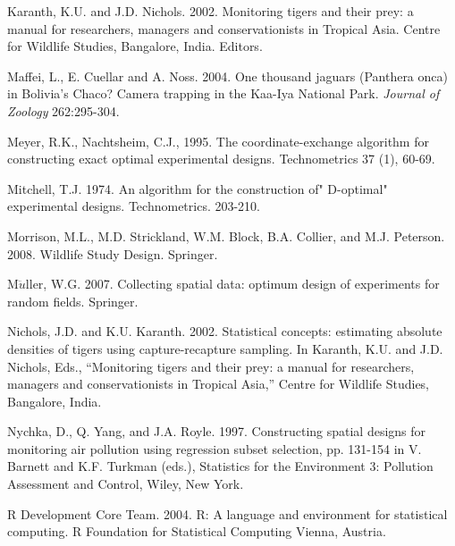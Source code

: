 \documentclass[useAMS,referee]{biom}
\begin{document}
 
\rf Karanth, K.U. and J.D. Nichols. 2002. Monitoring tigers and their 
prey: a manual for researchers, managers and conservationists in 
Tropical Asia. Centre for Wildlife Studies, Bangalore, India. Editors.

\rf Maffei, L., E. Cuellar and A. Noss. 2004. 
One thousand jaguars (Panthera onca) 
in Bolivia's Chaco? Camera trapping in the Kaa-Iya National Park. 
{\it Journal of Zoology} 262:295-304.


\rf Meyer, R.K., Nachtsheim, C.J., 1995. The coordinate-exchange algorithm for 
constructing exact optimal
experimental designs. Technometrics 37 (1), 60-69.

\rf Mitchell, T.J. 1974.
An algorithm for the construction of" D-optimal" experimental designs.
Technometrics.
203-210.

\rf Morrison, M.L., M.D. Strickland, W.M. Block, B.A. Collier, and 
M.J. Peterson. 2008. Wildlife Study Design. Springer.

\rf M$\ddot{u}$ller, W.G. 2007. 
Collecting spatial data: optimum design of experiments for random fields.
Springer.

\rf Nichols, J.D. and K.U. Karanth. 2002.  Statistical concepts:
estimating absolute densities of tigers using capture-recapture
sampling.  In Karanth, K.U. and J.D. Nichols, Eds., ``Monitoring
tigers and their prey: a manual for researchers, managers and
conservationists in Tropical Asia,'' Centre for Wildlife Studies,
Bangalore, India.

\rf  Nychka, D., Q. Yang, and J.A. Royle. 1997. Constructing spatial designs 
for monitoring air pollution using regression subset selection,
pp. 131-154 in V. Barnett and K.F. Turkman (eds.), Statistics for the 
Environment 3: Pollution Assessment and Control, Wiley, New York.

\rf R Development Core Team. 2004.
R: A language and environment for statistical computing.
R Foundation for Statistical Computing Vienna, Austria.
\end{document}
